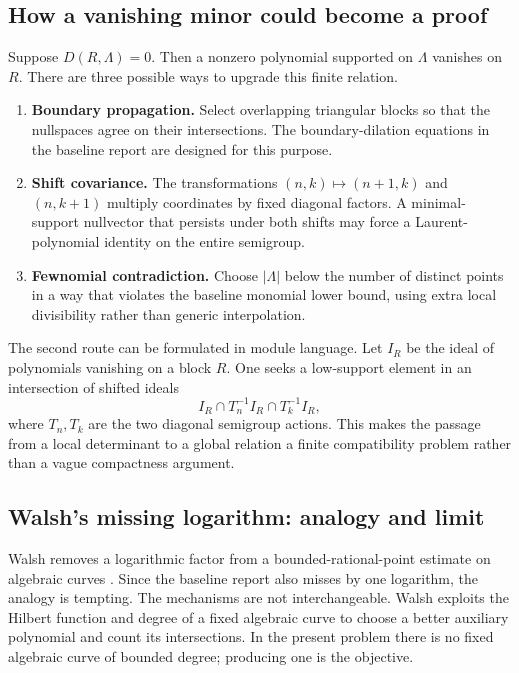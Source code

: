 \documentclass[10pt,letterpaper]{article}
\begin{document}
\subsection{How a vanishing minor could become a proof}

Suppose \(D(R,\Lambda)=0\).  Then a nonzero polynomial supported on \(\Lambda\) vanishes on
\(R\).  There are three possible ways to upgrade this finite relation.

\begin{enumerate}
\item \textbf{Boundary propagation.}  Select overlapping triangular blocks so that the
nullspaces agree on their intersections.  The boundary-dilation equations in the baseline
report are designed for this purpose.
\item \textbf{Shift covariance.}  The transformations
\((n,k)\mapsto(n+1,k)\) and \((n,k+1)\) multiply coordinates by fixed diagonal factors.
A minimal-support nullvector that persists under both shifts may force a Laurent-polynomial
identity on the entire semigroup.
\item \textbf{Fewnomial contradiction.}  Choose \(|\Lambda|\) below the number of distinct
points in a way that violates the baseline monomial lower bound, using extra local
divisibility rather than generic interpolation.
\end{enumerate}

The second route can be formulated in module language.  Let \(I_R\) be the ideal of
polynomials vanishing on a block \(R\).  One seeks a low-support element in an intersection
of shifted ideals
\[
  I_R\cap T_n^{-1}I_R\cap T_k^{-1}I_R,
\]
where \(T_n,T_k\) are the two diagonal semigroup actions.  This makes the passage from a
local determinant to a global relation a finite compatibility problem rather than a vague
compactness argument.

\subsection{Walsh's missing logarithm: analogy and limit}

Walsh removes a logarithmic factor from a bounded-rational-point estimate on algebraic
curves \cite{Walsh2015}.  Since the baseline report also misses by one logarithm, the analogy
is tempting.  The mechanisms are not interchangeable.  Walsh exploits the Hilbert function
and degree of a fixed algebraic curve to choose a better auxiliary polynomial and count its
intersections.  In the present problem there is no fixed algebraic curve of bounded degree;
producing one is the objective.
\end{document}
